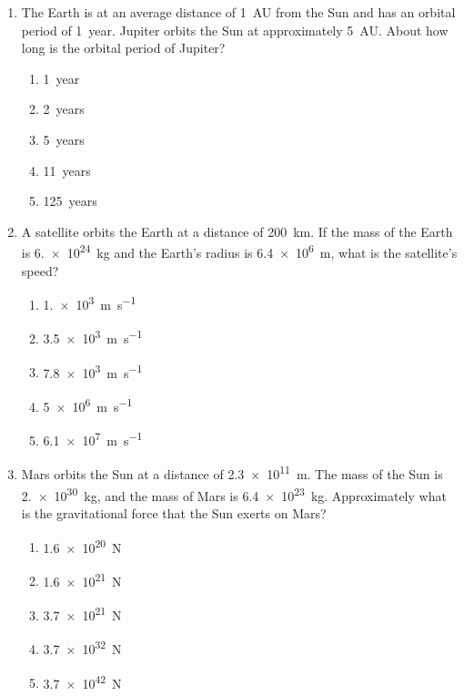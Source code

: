 \documentclass{../../oss-apphys}
\begin{document}
\begin{multicols}{2}
\begin{enumerate}[leftmargin=18pt,resume]
  \item The Earth is at an average distance of \SI{1}{AU} from the Sun and has
    an orbital period of \SI{1}{year}. Jupiter orbits the Sun at approximately
    \SI{5}{AU}. About how long is the orbital period of Jupiter?
    \begin{enumerate}[noitemsep,topsep=0pt,leftmargin=18pt,label=(\Alph*)]
    \item\SI{1}{year}
    \item\SI{2}{years}
    \item\SI{5}{years}
    \item\SI{11}{years}
    \item\SI{125}{years}
    \end{enumerate}

    \columnbreak
    
  \item A satellite orbits the Earth at a distance of \SI{200}{\km}. If the mass
    of the Earth is \SI{6.e24}{\kilo\gram} and the Earth's radius is
    \SI{6.4e6}{\metre}, what is the satellite's speed?
    \begin{enumerate}[noitemsep,topsep=0pt,leftmargin=18pt,label=(\Alph*)]
    \item\SI{1.e3}{\metre\per\second}
    \item\SI{3.5e3}{\metre\per\second}
    \item\SI{7.8e3}{\metre\per\second}
    \item\SI{5e6}{\metre\per\second}
    \item\SI{6.1e7}{\metre\per\second}
    \end{enumerate}
  
  \item Mars orbits the Sun at a distance of \SI{2.3e11}{\metre}. The mass of
    the Sun is \SI{2.e30}{\kilo\gram}, and the mass of Mars is
    \SI{6.4e23}{\kilo\gram}. Approximately what is the gravitational force that
    the Sun exerts on Mars?
    \begin{enumerate}[noitemsep,topsep=0pt,leftmargin=18pt,label=(\Alph*)]
    \item\SI{1.6e20}{\newton}
    \item\SI{1.6e21}{\newton}
    \item\SI{3.7e21}{\newton}
    \item\SI{3.7e32}{\newton}
    \item\SI{3.7e42}{\newton}
    \end{enumerate}


\end{enumerate}
\end{multicols}
\end{document}
